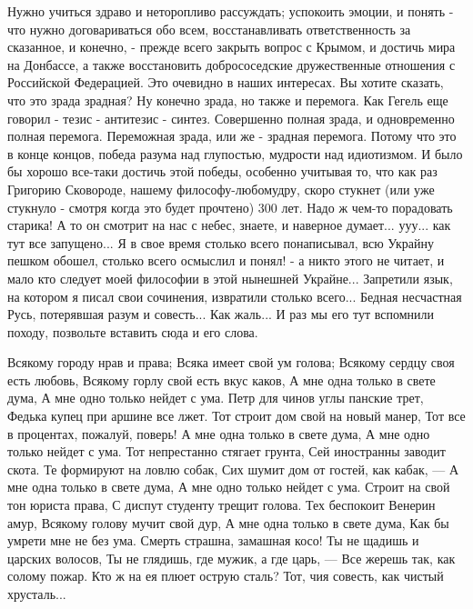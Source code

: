 Нужно учиться здраво и неторопливо рассуждать; успокоить эмоции, и понять - что
нужно договариваться обо всем, восстанавливать ответственность за сказанное, и
конечно, - прежде всего закрыть вопрос с Крымом, и достичь мира на Донбассе, а
также восстановить добрососедские дружественные отношения с Российской
Федерацией. Это очевидно в наших интересах. Вы хотите сказать, что это зрада
зрадная? Ну конечно зрада, но также и перемога. Как Гегель еще говорил - тезис
- антитезис - синтез.  Совершенно полная зрада, и одновременно полная перемога.
Переможная зрада, или же - зрадная перемога. Потому что это в конце концов,
победа разума над глупостью, мудрости над идиотизмом.  И было бы хорошо
все-таки достичь этой победы, особенно учитывая то, что как раз Григорию
Сковороде, нашему философу-любомудру, скоро стукнет (или уже стукнуло - смотря
когда это будет прочтено) 300 лет. Надо ж чем-то порадовать старика! А то он
смотрит на нас с небес, знаете, и наверное думает...  ууу...  как тут все
запущено... Я в свое время столько всего понаписывал, всю Украйну пешком
обошел, столько всего осмыслил и понял! - а никто этого не читает, и мало кто
следует моей философии в этой нынешней Украйне... Запретили язык, на котором я
писал свои сочинения, извратили столько всего... Бедная несчастная Русь,
потерявшая разум и совесть... Как жаль... И раз мы его тут вспомнили походу,
позвольте вставить сюда и его слова.

\raggedcolumns
\begin{multicols}{2} %
\setlength{\parindent}{0pt}
\obeycr
Всякому городу нрав и права;
Всяка имеет свой ум голова;
Всякому сердцу своя есть любовь,
Всякому горлу свой есть вкус каков,
\smallskip
А мне одна только в свете дума,
А мне одно только нейдет с ума.
Петр для чинов углы панские трет,
Федька купец при аршине все лжет.
\smallskip
Тот строит дом свой на новый манер,
Тот все в процентах, пожалуй, поверь!
А мне одна только в свете дума,
А мне одно только нейдет с ума.
\smallskip
Тот непрестанно стягает грунта,
Сей иностранны заводит скота.
Те формируют на ловлю собак,
Сих шумит дом от гостей, как кабак, —
\smallskip
А мне одна только в свете дума,
А мне одно только нейдет с ума.
Строит на свой тон юриста права,
С диспут студенту трещит голова.
\smallskip
Тех беспокоит Венерин амур,
Всякому голову мучит свой дур,
А мне одна только в свете дума,
Как бы умрети мне не без ума.
\smallskip
Смерть страшна, замашная косо!
Ты не щадишь и царских волосов,
Ты не глядишь, где мужик, а где царь, —
Все жерешь так, как солому пожар.
\smallskip
Кто ж на ея плюет острую сталь?
Тот, чия совесть, как чистый хрусталь...
\restorecr
\end{multicols} %

